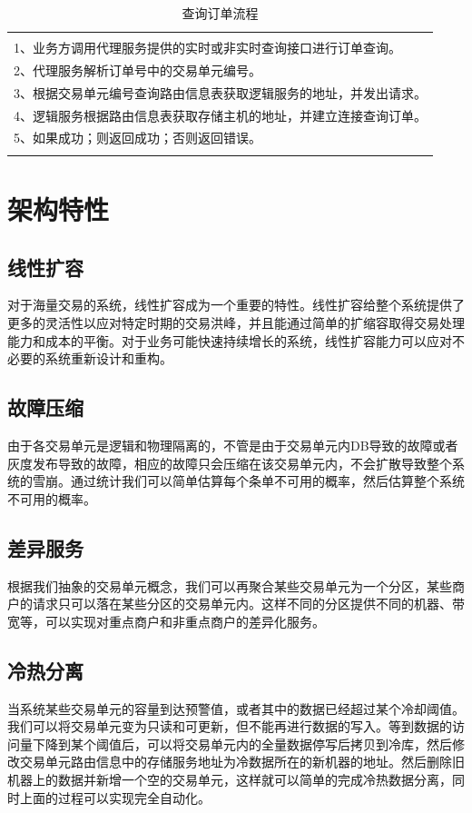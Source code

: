 \documentclass[letterpaper,twocolumn,10pt]{article}
\begin{document}
\begin{table}[htp]
\caption{查询订单流程}
\begin{center}
\begin{tabular}{l}
\hline
\\
1、业务方调用代理服务提供的实时或非实时查询接口进行订单查询。\\
2、代理服务解析订单号中的交易单元编号。 \\
3、根据交易单元编号查询路由信息表获取逻辑服务的地址，并发出请求。 \\
4、逻辑服务根据路由信息表获取存储主机的地址，并建立连接查询订单。\\
5、如果成功；则返回成功；否则返回错误。\\
\\
\hline
\end{tabular}
\end{center}
\label{query}
\end{table}%

\section {架构特性}
\subsection {线性扩容}
对于海量交易的系统，线性扩容成为一个重要的特性。线性扩容给整个系统提供了更多的灵活性以应对特定时期的交易洪峰，并且能通过简单的扩缩容取得交易处理能力和成本的平衡。对于业务可能快速持续增长的系统，线性扩容能力可以应对不必要的系统重新设计和重构。

\subsection {故障压缩}
由于各交易单元是逻辑和物理隔离的，不管是由于交易单元内DB导致的故障或者灰度发布导致的故障，相应的故障只会压缩在该交易单元内，不会扩散导致整个系统的雪崩。通过统计我们可以简单估算每个条单不可用的概率，然后估算整个系统不可用的概率。

\subsection {差异服务}
根据我们抽象的交易单元概念，我们可以再聚合某些交易单元为一个分区，某些商户的请求只可以落在某些分区的交易单元内。这样不同的分区提供不同的机器、带宽等，可以实现对重点商户和非重点商户的差异化服务。

\subsection {冷热分离}
当系统某些交易单元的容量到达预警值，或者其中的数据已经超过某个冷却阈值。我们可以将交易单元变为只读和可更新，但不能再进行数据的写入。等到数据的访问量下降到某个阈值后，可以将交易单元内的全量数据停写后拷贝到冷库，然后修改交易单元路由信息中的存储服务地址为冷数据所在的新机器的地址。然后删除旧机器上的数据并新增一个空的交易单元，这样就可以简单的完成冷热数据分离，同时上面的过程可以实现完全自动化。
\end{document}

